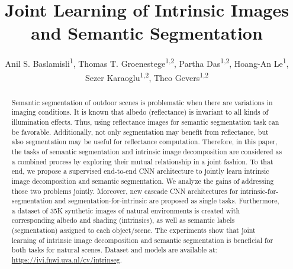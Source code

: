 \documentclass[runningheads]{llncs}
\begin{document}
\pagestyle{headings}
\mainmatter

\title{Joint Learning of Intrinsic Images and Semantic Segmentation} 



\author{Anil S. Baslamisli\textsuperscript{1}, Thomas T. Groenestege\textsuperscript{1,2}, Partha Das\textsuperscript{1,2}, Hoang-An Le\textsuperscript{1}, Sezer Karaoglu\textsuperscript{1,2}, Theo Gevers\textsuperscript{1,2}}




\maketitle

\begin{abstract}
Semantic segmentation of outdoor scenes is problematic when there are variations in imaging conditions. It is known that albedo (reflectance) is invariant to all kinds of illumination effects. Thus, using reflectance images for semantic segmentation task can be favorable. Additionally, not only segmentation may benefit from reflectance, but also segmentation may be useful for reflectance computation. Therefore, in this paper, the tasks of semantic segmentation and intrinsic image decomposition are considered as a combined process by exploring their mutual relationship in a joint fashion. To that end, we propose a supervised end-to-end CNN architecture to jointly learn intrinsic image decomposition and semantic segmentation. We analyze the gains of addressing those two problems jointly. Moreover, new cascade CNN architectures for intrinsic-for-segmentation and segmentation-for-intrinsic are proposed as single tasks. Furthermore, a dataset of 35K synthetic images of natural environments is created with corresponding albedo and shading (intrinsics), as well as semantic labels (segmentation) assigned to each object/scene. The experiments show that joint learning of intrinsic image decomposition and semantic segmentation is beneficial for both tasks for natural scenes. Dataset and models are available at:  \url{https://ivi.fnwi.uva.nl/cv/intrinseg}.

\end{abstract}
\end{document}
